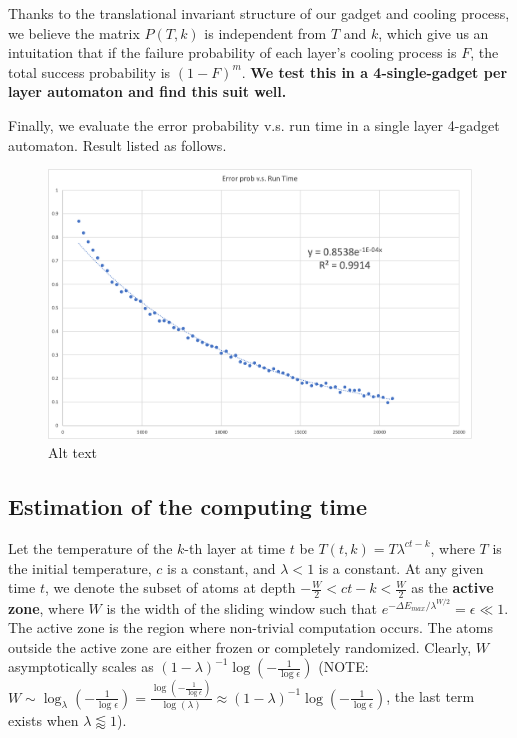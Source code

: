 \documentclass[twocolumn,superscriptaddress,english,showpacs,longbibliography]{revtex4-2}
\begin{document}
Thanks to the translational invariant structure of our gadget and
cooling process, we believe the matrix $P(T,k)$ is independent from
$T$ and $k$, which give us an intuitation that if the failure
probability of each layer's cooling process is $F$, the total success
probability is $(1-F)^m$. \textbf{We test this in a 4-single-gadget
per layer automaton and find this suit well.}

Finally, we evaluate the error probability v.s. run time in a single
layer 4-gadget automaton. Result listed as follows.

\begin{figure}
\centering
\includegraphics[keepaspectratio]{../notes/images/error vs runtime.png}
\caption{Alt text}
\end{figure}

\subsection{Estimation of the computing
time}\label{estimation-of-the-computing-time}

Let the temperature of the $k$-th layer at time $t$ be
$T(t, k) = T \lambda^{ct - k}$, where $T$ is the initial
temperature, $c$ is a constant, and $\lambda < 1$ is a constant. At
any given time $t$, we denote the subset of atoms at depth
$-\frac{W}{2} < ct - k < \frac{W}{2}$ as the \textbf{active zone},
where $W$ is the width of the sliding window such that
$e^{-\Delta E_{max} /\lambda^{W/2}} = \epsilon \ll 1$. The active zone
is the region where non-trivial computation occurs. The atoms outside
the active zone are either frozen or completely randomized. Clearly,
$W$ asymptotically scales as
$(1-\lambda)^{-1} \log(-\frac{1}{\log\epsilon})$
(NOTE:$W \sim \log_{\lambda}(-\frac{1}{\log{\epsilon}}) = \frac{\log(-\frac{1}{\log{\epsilon}})}{\log(\lambda)} \approx (1 - \lambda)^{-1}\log(-\frac{1}{\log \epsilon})$,
the last term exists when $\lambda \lessapprox 1$).
\end{document}
